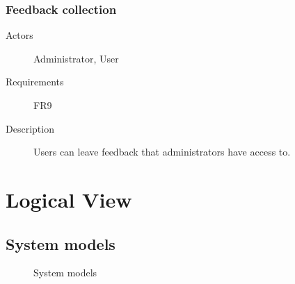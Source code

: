 \documentclass[
    english, %
]{VUMIFPSkursinis}
\begin{document}
\subsubsection{Feedback collection}

\begin{description}
    \item[Actors] Administrator, User
    \item[Requirements] FR9
    \item[Description] Users can leave feedback that administrators have access to.
\end{description}

\section{Logical View}

\subsection{System models}

\begin{figure}[ht]
    \centering
    
    \label{system-models}
    \caption{System models}
\end{figure}
\end{document}
